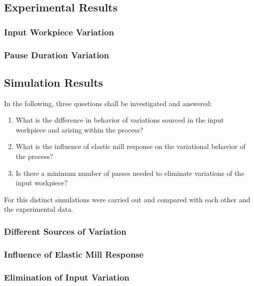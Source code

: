 \subsection{Experimental Results}\label{subsec:experimental-results}

\subsubsection{Input Workpiece Variation}\label{subsubsec:input-workpiece-variation}

\subsubsection{Pause Duration Variation}\label{subsubsec:pause-duration-variation}



\subsection{Simulation Results}\label{subsec:simulation-results}

In the following, three questions shall be investigated and answered:
\begin{enumerate}
    \item What is the difference in behavior of variations sourced in the input workpiece and arising within the process?
    \item What is the influence of elastic mill response on the variational behavior of the process?
    \item Is there a minimum number of passes needed to eliminate variations of the input workpiece?
\end{enumerate}

For this distinct simulations were carried out and compared with each other and the experimental data.

\subsubsection{Different Sources of Variation}\label{subsubsec:different-sources-of-variation}

\subsubsection{Influence of Elastic Mill Response}\label{subsubsec:influence-of-elastic-mill-response}

\subsubsection{Elimination of Input Variation}\label{subsubsec:elimination-of-input-variation}